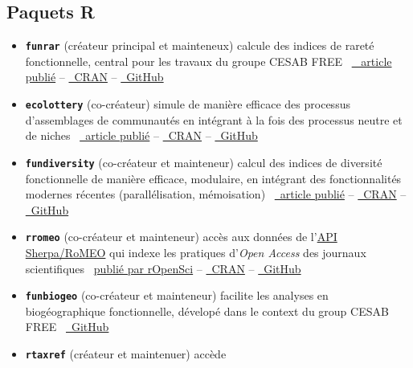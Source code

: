 \documentclass[10pt,a4paper,]{article}
\begin{document}
\hypertarget{paquets-r}{%
\subsection{Paquets R}\label{paquets-r}}

\begin{itemize}
\item
  \textbf{\texttt{funrar}} (créateur principal et mainteneux)
  \hfill\break calcule des indices de rareté fonctionnelle, central pour
  les travaux du groupe CESAB FREE
  \hfill\break ~\href{https://doi.org/10.1111/ddi.12629}{\faFile*~
  article publié} --
  \href{https://cran.r-project.org/package=funrar}{\faRProject~CRAN} --
  \href{https://github.com/Rekyt/funrar}{\faGithub~GitHub}
\item
  \textbf{\texttt{ecolottery}} (co-créateur) \hfill\break simule de
  manière efficace des processus d'assemblages de communautés en
  intégrant à la fois des processus neutre et de niches
  \hfill\break ~\href{https://doi.org/10.1111/2041-210X.12918}{\faFile*~article
  publié} --
  \href{https://cran.r-project.org/package=ecolottery}{\faRProject~CRAN}
  -- \href{https://github.com/frmunoz/ecolottery}{\faGithub~GitHub}
\item
  \textbf{\texttt{fundiversity}} (co-créateur et mainteneur)
  \hfill\break calcul des indices de diversité fonctionnelle de manière
  efficace, modulaire, en intégrant des fonctionnalités modernes
  récentes (parallélisation, mémoisation)
  \hfill\break ~\href{https://doi.org/10.1111/ecog.06585}{\faFile*~article
  publié} --
  \href{https://cran.r-project.org/package=fundiversity}{\faRProject~CRAN}
  -- \href{https://github.com/bisaloo/fundiversity}{\faGithub~GitHub}
\item
  \textbf{\texttt{rromeo}} (co-créateur et mainteneur)
  \hfill\break accès aux données de
  l'\href{https://v2.sherpa.ac.uk/romeo/}{API Sherpa/RoMEO} qui indexe
  les pratiques d'\textit{Open Access} des journaux scientifiques
  \hfill\break~\href{https://docs.ropensci.org/rromeo}{publié par
  rOpenSci} --
  \href{https://cran.r-project.org/package=rromeo}{\faRProject~CRAN} --
  \href{https://github.com/ropensci/rromeo}{\faGithub~GitHub}
\item
  \textbf{\texttt{funbiogeo}} (co-créateur et mainteneur)
  \hfill\break facilite les analyses en biogéographique fonctionnelle,
  dévelopé dans le context du group CESAB FREE
  \hfill\break ~\href{https://github.com/FRBCesab/funbiogeo}{\faGithub~GitHub}
\item
  \textbf{\texttt{rtaxref}} (créateur et maintenuer) \hfill\break accède

\end{itemize}
\end{document}
